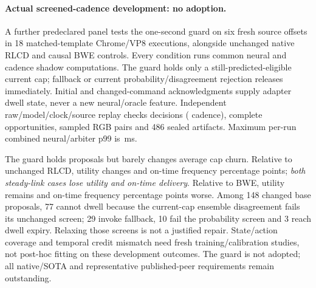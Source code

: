 \documentclass[10pt]{article}
\begin{document}
\paragraph{Actual screened-cadence development: no adoption.}
A further predeclared panel tests the one-second guard on six fresh source offsets in 18 matched-template Chrome/VP8 executions, alongside unchanged native RLCD and causal BWE controls. Every condition runs common neural and cadence shadow computations. The guard holds only a still-predicted-eligible current cap; fallback or current probability/disagreement rejection releases immediately. Initial and changed-command acknowledgments supply adapter dwell state, never a new neural/oracle feature. Independent raw/model/clock/source replay checks \NativeCadenceTotalDecisions{} decisions (\NativeCadenceDecisions{} cadence), \NativeCadenceRequests{} complete opportunities, \NativeCadencePairs{} sampled RGB pairs and 486 sealed artifacts. Maximum per-run combined neural/arbiter p99 is \NativeCadencePolicyTail{}\,ms.
\begin{table}[ht]
\centering

\caption{Actual single-model screened-cadence development, six fresh matched source/schedule templates. Independent packet trajectories, common native GCC/shadow compute, synthetic content and no promotion/final-test scope limit interpretation.}
\label{tab:native-cadence-development}
\end{table}
The guard holds \NativeCadenceHolds{} proposals but barely changes average cap churn. Relative to unchanged RLCD, utility changes \NativeCadenceRlUtilityDelta{} and on-time frequency \NativeCadenceRlOntimeDelta{} percentage points; \emph{both steady-link cases lose utility and on-time delivery}. Relative to BWE, utility remains \NativeCadenceBweUtilityDelta{} and on-time frequency \NativeCadenceBweOntimeDelta{} percentage points worse. Among 148 changed base proposals, 77 cannot dwell because the current-cap ensemble disagreement fails its unchanged screen; 29 invoke fallback, 10 fail the probability screen and 3 reach dwell expiry. Relaxing those screens is not a justified repair. State/action coverage and temporal credit mismatch need fresh training/calibration studies, not post-hoc fitting on these development outcomes. The guard is not adopted; all native/SOTA and representative published-peer requirements remain outstanding.
\end{document}
